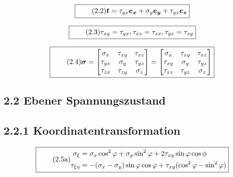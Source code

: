 \documentclass[11pt]{article}
\newcommand{\1}{ {\mathds{1}} }
\begin{document}
    \begin{equation}
      \boxed{
        \tag{2.2}
        \begin{split}
          \boldsymbol{t}
          =
          \tau_{yx} \boldsymbol{e_x}
          +
          \sigma_y  \boldsymbol{e_y}
          +
          \tau_{yz} \boldsymbol{e_z}
        \end{split}
      }
    \end{equation}

    \begin{equation}
      \boxed{
        \tag{2.3}
        \begin{split}
          \tau_{xy} = \tau_{yx},
          \tau_{xz} = \tau_{zx},
          \tau_{yz} = \tau_{zy}
        \end{split}
      }
    \end{equation}
    
    \begin{equation}
      \boxed{
        \tag{2.4}
        \begin{split}
          \boldsymbol{\sigma}
          =
          \begin{bmatrix*}
            \sigma_{x} & \tau_{xy}  & \tau_{xz} \\
            \tau_{yx}  & \sigma_{y} & \tau_{yz} \\
            \tau_{zx}  & \tau_{zy}  & \sigma_{z}
          \end{bmatrix*}
          =
          \begin{bmatrix*}
            \sigma_{x} & \tau_{xy}  & \tau_{xz} \\
            \tau_{xy}  & \sigma_{y} & \tau_{yz} \\
            \tau_{xz}  & \tau_{yz}  & \sigma_{z}
          \end{bmatrix*}          
        \end{split}
      }
    \end{equation}

    \subsection*{2.2 Ebener Spannungszustand}
    
    \subsection*{2.2.1 Koordinatentransformation}

    \begin{equation}
      \boxed{
        \tag{2.5a}
        \begin{split}
          \sigma_{\xi} &= \sigma_x \cos^2 \varphi + \sigma_y \sin^2\varphi + 2 \tau_{xy} \sin\varphi \cos\phi\\
          \tau_{\xi \eta} &= -(\sigma_x - \sigma_y) \sin \varphi \cos \varphi + \tau_{xy} (\cos^2\varphi - \sin^2\varphi)
        \end{split}
      }
    \end{equation}
   
\end{document}
